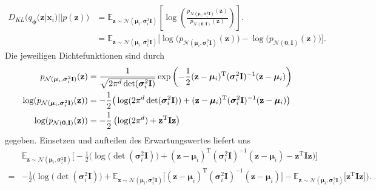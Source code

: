 \documentclass[12pt]{article}
\newcommand{\z}{\mathbf{z}}
\begin{document}
	\begin{align*}
	D_{KL}\big(q_{\boldsymbol\phi}(\textbf{z}|\textbf{x}_{i}) || p(\textbf{z})\big) &= \mathbb{E}_{\z\sim\mathcal{N}(\boldsymbol\mu_{i},\boldsymbol\sigma_{i}^{2}\mathbf{I})}\left[\log\left(\frac{p_{\mathcal{N}(\boldsymbol\mu_{i},\boldsymbol\sigma_{i}^{2}\mathbf{I})}(\textbf{z})}{p_{\mathcal{N}(\mathbf{0},\mathbf{I})}(\textbf{z})}\right)\right].\\
	&= \mathbb{E}_{\z\sim\mathcal{N}(\boldsymbol\mu_{i},\boldsymbol\sigma_{i}^{2}\mathbf{I})}\big[\log\big(p_{\mathcal{N}(\boldsymbol\mu_{i},\boldsymbol\sigma_{i}^{2}\mathbf{I})}(\textbf{z})\big)
	- \log\big(p_{\mathcal{N}(\mathbf{0},\mathbf{I})}(\textbf{z})\big)\big].
	\end{align*}
	Die jeweiligen Dichtefunktionen sind durch
	\begin{align*}
	p_{\mathcal{N}(\boldsymbol\mu_{i},\boldsymbol\sigma_{i}^{2}\mathbf{I})}(\textbf{z})&= \frac{1}{\sqrt{2\pi^{d} \det(\boldsymbol\sigma_{i}^{2}\mathbf{I})}}\exp\left(-\frac{1}{2}(\textbf{z}-\boldsymbol\mu_{i})^{\mathrm{T}}(\boldsymbol\sigma_{i}^{2}\mathbf{I})^{-1}(\textbf{z}-\boldsymbol\mu_{i})\right) \notag \\
	\log(p_{\mathcal{N}(\boldsymbol\mu_{i},\boldsymbol\sigma_{i}^{2}\mathbf{I})}(\textbf{z}))&= -\frac{1}{2}\big(\log(2\pi^{d} \det(\boldsymbol\sigma_{i}^{2}\mathbf{I}))+(\textbf{z}-\boldsymbol\mu_{i})^{\mathrm{T}}(\boldsymbol\sigma_{i}^{2}\mathbf{I})^{-1}(\textbf{z}-\boldsymbol\mu_{i})\big)\\ \notag
	\log(p_{\mathcal{N}(\mathbf{0},\mathbf{I})}(\textbf{z}))&= -\frac{1}{2}\left(\log(2\pi^{d} )+\textbf{z}^{\mathrm{T}}\mathbf{I}\textbf{z}\right)
	\end{align*}
	gegeben. Einsetzen und aufteilen des Erwartungswertes liefert uns
	\begin{align*}
	&\mathbb{E}_{\z\sim\mathcal{N}(\boldsymbol\mu_{i},\boldsymbol\sigma_{i}^{2}\mathbf{I})}\Big[-\frac{1}{2}\Big(\log\big(\det(\boldsymbol\sigma_{i}^{2}\mathbf{I})\big)+(\textbf{z}-\boldsymbol\mu_{i})^{\mathrm{T}}(\boldsymbol\sigma_{i}^{2}\mathbf{I})^{-1}(\textbf{z}-\boldsymbol\mu_{i})-\textbf{z}^{\mathrm{T}}\mathbf{I}\textbf{z}\Big)\Big]\\
	=
	&-\frac{1}{2}\Big(\log\big(\det(\boldsymbol\sigma_{i}^{2}\mathbf{I})\big)+\mathbb{E}_{\z\sim\mathcal{N}(\boldsymbol\mu_{i},\boldsymbol\sigma_{i}^{2}\mathbf{I})}\big[(\textbf{z}-\boldsymbol\mu_{i})^{\mathrm{T}}(\boldsymbol\sigma_{i}^{2}\mathbf{I})^{-1}(\textbf{z}-\boldsymbol\mu_{i})\big]-\mathbb{E}_{\z\sim\mathcal{N}(\boldsymbol\mu_{i},\boldsymbol\sigma_{i}^{2}\mathbf{I})}\big[\textbf{z}^{\mathrm{T}}\mathbf{I}\textbf{z}\big]\Big).
	\end{align*}
\end{document}
